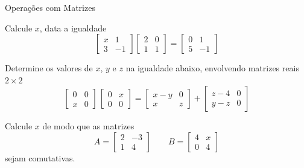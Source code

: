 \begin{exercicios}{Operações com Matrizes}
    \begin{exercicio}
        Calcule $x$, data a igualdade
        \[\left[\begin{array}{cr}
            x & 1  \\
            3 & -1
        \end{array} \right]
        \left[\begin{array}{cc}
            2 & 0 \\
            1 & 1
        \end{array} \right]    =
        \left[\begin{array}{cr}
            0 & 1  \\
            5 & -1
        \end{array} \right]\]
    \end{exercicio}

    \begin{exercicio}
        Determine os valores de $x$, $y$ e $z$ na igualdade abaixo, envolvendo matrizes reais $2 \times 2$
        \[\left[\begin{array}{cc}
        0 & 0 \\
        x & 0
        \end{array} \right]    \,
        \left[\begin{array}{cc}
        0 & x \\
        0 & 0
        \end{array} \right] = 
        \left[\begin{array}{cc}
        x - y & 0 \\
        x   & z
        \end{array} \right] +
        \left[\begin{array}{cc}
        z - 4 & 0 \\
        y - z & 0
        \end{array} \right]\]
    \end{exercicio}
    
    \begin{exercicio}
        Calcule $x$ de modo que as matrizes
        \[A = \left[\begin{array}{rr}
        2 & -3 \\
        1 & 4
        \end{array} \right]    
        \qquad
        B = \left[\begin{array}{cc}
        4 & x \\
        0 & 4
        \end{array} \right]\]
        sejam comutativas.
    \end{exercicio}
    

\end{exercicios}
